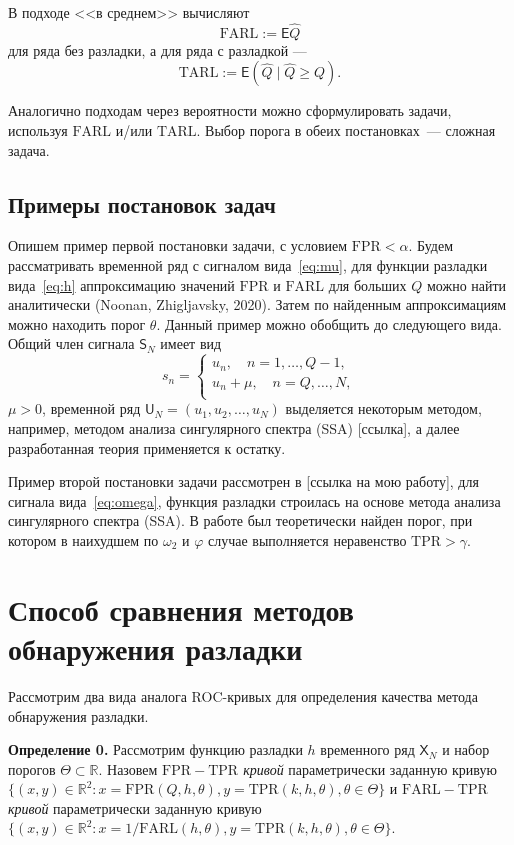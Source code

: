 \documentclass{math-mech-sci}
\newcommand{\X}{\mathsf X}
\renewcommand{\S}{\mathsf S}
\newcommand{\FPR}{\mathrm{FPR}}
\newcommand{\TPR}{\mathrm{TPR}}
\newcommand{\FARL}{\mathrm{FARL}}
\newcommand{\TARL}{\mathrm{TARL}}
\renewcommand{\geq}{\geqslant}
\begin{document}
	В подходе <<в среднем>> вычисляют
	\begin{equation}
	\FARL:=\mathsf E\widehat Q
	\end{equation}
	для ряда без разладки, а для ряда с разладкой ---
	\begin{equation}
		\TARL:=\mathsf E (\widehat Q\mid \widehat Q\geq Q).
	\end{equation}

Аналогично подходам через вероятности можно сформулировать задачи, используя $\FARL$ и/или $\TARL$. Выбор порога в обеих постановках~--- сложная задача.

\subsection{Примеры постановок задач}
Опишем пример первой постановки задачи, с условием $\FPR<\alpha$. Будем рассматривать временной ряд с сигналом вида~\eqref{eq:mu}, для функции разладки вида~\eqref{eq:h} аппроксимацию значений $\FPR$ и $\FARL$ для больших $Q$ можно найти аналитически (Noonan, Zhigljavsky, 2020). Затем по найденным аппроксимациям можно находить порог $\theta$. Данный пример можно обобщить до следующего вида. Общий член сигнала $\S_N$ имеет вид
\begin{equation}
	s_n=\begin{cases}
		u_n,\quad n=1,\ldots,Q-1,\\
		u_n+\mu,\quad n=Q,\ldots,N,\\
	\end{cases}
\end{equation}
	$\mu>0$, временной ряд $\mathsf U_N=(u_1,u_2,\ldots,u_N)$ выделяется некоторым методом, например, методом анализа сингулярного спектра (SSA) [ссылка], а далее разработанная теория применяется к остатку.
	
	Пример второй постановки задачи рассмотрен в [ссылка на мою работу], для сигнала вида~\eqref{eq:omega}, функция разладки строилась на основе метода анализа сингулярного спектра (SSA). В работе был теоретически найден порог, при котором в наихудшем по $\omega_2$ и $\varphi$ случае выполняется неравенство $\TPR>\gamma$.
	
\section{Способ сравнения методов обнаружения разладки}
	Рассмотрим два вида аналога ROC-кривых для определения качества метода обнаружения разладки. 

	\textbf{Определение 0.} Рассмотрим функцию разладки $h$ временного ряд $\X_N$ и набор порогов $\Theta\subset\mathbb R$. Назовем \textit{$\FPR-\TPR$ кривой} параметрически заданную кривую $\{(x,y)\in\mathbb R^2:x=\FPR(Q,h,\theta),y=\TPR(k,h,\theta),\theta\in\Theta\}$ и \textit{$\FARL-\TPR$ кривой} параметрически заданную кривую $\{(x,y)\in\mathbb R^2:x=1/\FARL(h,\theta),y=\TPR(k,h,\theta),\theta\in\Theta\}$.
\end{document}
